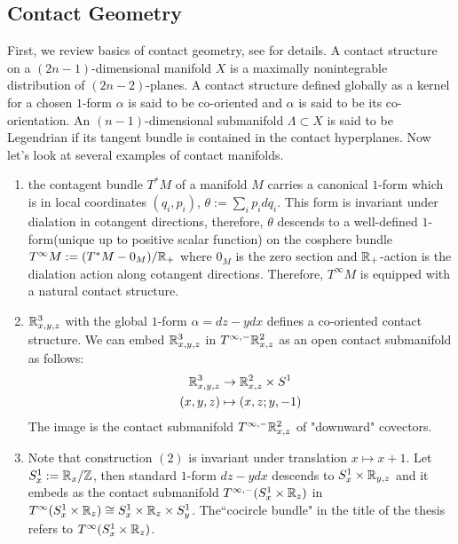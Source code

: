 \subsection*{Contact Geometry}
First, we review basics of contact geometry, see \cite{etnyre2005legendrian}\cite{geiges2008introduction} for details. A contact structure on a $(2n-1)$-dimensional manifold $X$ is a maximally nonintegrable distribution of $(2n-2)$-planes. A contact structure defined globally as a kernel for a chosen $1$-form $\alpha$ is said to be co-oriented and $\alpha$ is said to be its co-orientation. An $(n-1)$-dimensional submanifold $\Lambda \subset X$ is said to be Legendrian if its tangent bundle is contained in the contact hyperplanes. Now let's look at several examples of contact manifolds.
\begin{enumerate}[label = (\arabic*)]
\item the contagent bundle $T^*M$ of a manifold $M$ carries a canonical $1$-form which is in local coordinates $(q_i,p_i)$, $\theta := \underset{i}{\sum} p_i dq_i$. This form is invariant under dialation in cotangent directions, therefore, $\theta$ descends to a well-defined $1$-form(unique up to positive scalar function) on the cosphere bundle $T^\infty M := (T^*M - 0_M)/\mathbb{R}_+$ where $0_M$ is the zero section and $\mathbb{R}_+$-action is the dialation action along cotangent directions. Therefore, $T^\infty M$ is equipped with a natural contact structure.

\item $\mathbb{R}^3_{x,y,z}$ with the global $1$-form $\alpha = dz - ydx$ defines a co-oriented contact structure. We can embed $\mathbb{R}^3_{x,y,z}$ in $T^{\infty,-}\mathbb{R}^2_{x,z}$ as an open contact submanifold as follows:
\begin{align*}
\mathbb{R}^3_{x,y,z} &\rightarrow \mathbb{R}^2_{x,z} \times S^1 \\
(x,y,z) & \mapsto (x,z;y,-1)
\end{align*}
The image is the contact submanifold $T^{\infty,-}\mathbb{R}^2_{x,z}$ of "downward" covectors.

\item Note that construction $(2)$ is invariant under translation $x \mapsto x+1$. Let $S^1_x := \mathbb{R}_x / \mathbb{Z}$, then standard $1$-form $dz - ydx$ descends to $S^1_x \times \mathbb{R}_{y,z}$ and it embeds as the contact submanifold $T^{\infty, -}(S^1_x \times \mathbb{R}_z)$ in $T^\infty(S^1_x \times \mathbb{R}_z)\cong S^1_x \times \mathbb{R}_z \times S^1_y$. The``cocircle bundle" in the title of the thesis refers to $T^\infty (S^1_x \times \mathbb{R}_z)$.
\end{enumerate}

